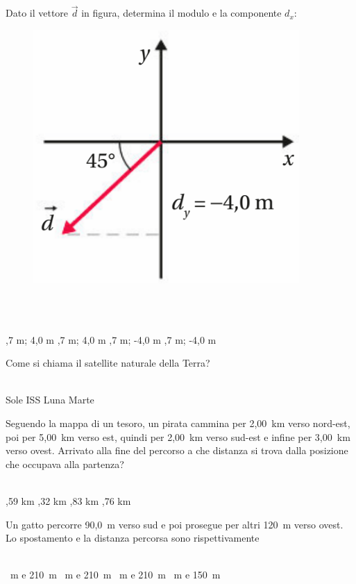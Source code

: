 \documentclass[a4paper,11pt]{exam}
\begin{document}
\begin{questions}
    
\question Dato il vettore $\vec{d}$ in figura, determina il modulo e la componente $d_x$: \begin{figure}[h!]   \begin{center}     \includegraphics[scale=0.35]{vettored.png}   \end{center} \end{figure}\\\
\begin{oneparchoices}
  ,7 m; 4,0 m
  ,7 m; 4,0 m
  \choice 5,7 m; -4,0 m
  \choice -5,7 m; -4,0 m
\end{oneparchoices}

    
\question Come si chiama il satellite naturale della Terra?\\\
\begin{oneparchoices}
  \choice Sole
  \choice ISS
  \choice Luna
  \choice Marte
\end{oneparchoices}

    
\question Seguendo la mappa di un tesoro, un pirata cammina per 2,00~km verso nord-est, poi per 5,00~km verso est, quindi per 2,00~km verso sud-est e infine per 3,00~km verso ovest. Arrivato alla fine del percorso a che distanza si trova dalla posizione che occupava alla partenza?\\\
\begin{oneparchoices}
  ,59 km
  \choice 6,32 km
  \choice 4,83 km
  \choice 4,76 km
\end{oneparchoices}

    
\question Un gatto percorre 90,0~m verso sud e poi prosegue per altri 120~m verso ovest. Lo spostamento e la distanza percorsa sono rispettivamente\\\
\begin{oneparchoices}
  \choice 150~m e 210~m
  \choice 30~m e 210~m
  \choice 210~m e 210~m
  \choice 210~m e 150~m
\end{oneparchoices}


\end{questions}
\end{document}
